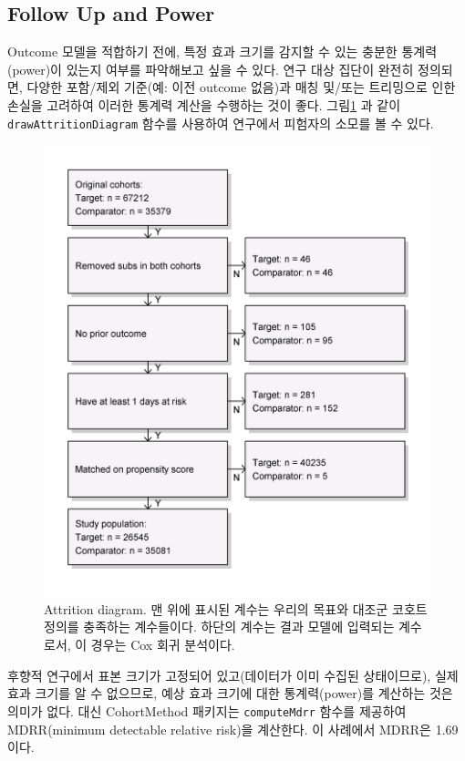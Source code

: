 \documentclass[11pt]{book}
\theoremstyle{definition}
\theoremstyle{definition}
\theoremstyle{definition}
\theoremstyle{remark}
\begin{document}
\subsection{Follow Up and Power}\label{follow-up-and-power}

Outcome 모델을 적합하기 전에, 특정 효과 크기를 감지할 수 있는 충분한
통계력(power)이 있는지 여부를 파악해보고 싶을 수 있다. 연구 대상 집단이
완전히 정의되면, 다양한 포함/제외 기준(예: 이전 outcome 없음)과 매칭
및/또는 트리밍으로 인한 손실을 고려하여 이러한 통계력 계산을 수행하는
것이 좋다. 그림\ref{fig:attrition} 과 같이 \texttt{drawAttritionDiagram}
함수를 사용하여 연구에서 피험자의 소모를 볼 수 있다.

\begin{figure}

{\centering \includegraphics[width=0.7\linewidth]{images/PopulationLevelEstimation/attrition} 

}

\caption{Attrition diagram. 맨 위에 표시된 계수는 우리의 목표와 대조군 코호트 정의를 충족하는 계수들이다. 하단의 계수는 결과 모델에 입력되는 계수로서, 이 경우는 Cox 회귀 분석이다.}\label{fig:attrition}
\end{figure}

후향적 연구에서 표본 크기가 고정되어 있고(데이터가 이미 수집된
상태이므로), 실제 효과 크기를 알 수 없으므로, 예상 효과 크기에 대한
통계력(power)를 계산하는 것은 의미가 없다. 대신 CohortMethod 패키지는
\texttt{computeMdrr} 함수를 제공하여 MDRR(minimum detectable relative
risk)을 계산한다. 이 사례에서 MDRR은 1.69이다.
 
\end{document}
